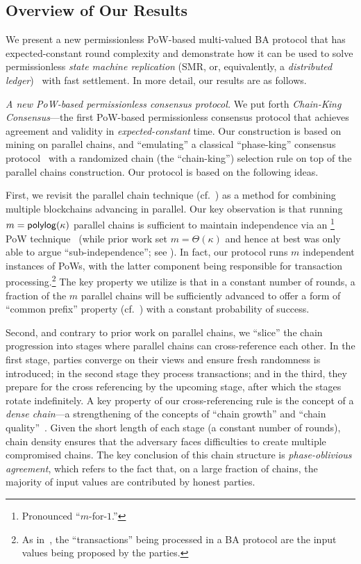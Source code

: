 \subsection{Overview of Our Results}
\label{subec:overview-of-our-results}

We present a new permissionless PoW-based multi-valued BA protocol that has expected-constant round complexity and demonstrate how it can be used to solve permissionless \emph{state machine replication} (SMR, or, equivalently, a \emph{distributed ledger})~\cite{CSUR:Schneider90} with fast settlement.
%
In more detail, our results are as follows.

\smallskip\noindent\emph{A new PoW-based permissionless consensus protocol.}
%
We put forth \emph{Chain-King Consensus}---the first PoW-based permissionless consensus protocol that achieves agreement and validity in \emph{expected-constant} time.
%
Our construction is based on mining on parallel chains, and ``emulating'' a classical ``phase-king'' consensus protocol~\cite{FOCS:BerGarPer89} with a randomized chain (the ``chain-king'') selection rule on top of the parallel chains construction.
%
Our protocol is based on the following ideas.

First, we revisit the parallel chain technique (cf.~\cite{EPRINT:FGKR18,CCS:BKTFV19,TCC:FGKR20}) as a method for combining multiple blockchains advancing in parallel.
%
Our key observation is that running $m = \mathsf{polylog}(\kappa)$ parallel chains is sufficient to maintain independence via an \mforone\footnote{Pronounced ``$m$-for-$1$.''} PoW technique~\cite{EC:GarKiaLeo15} (while prior work set $m = \Theta(\kappa)$ and hence at best was only able to argue ``sub-independence''; see \cite{TCC:FGKR20}).
%
In fact, our protocol runs $m$ independent instances of \twoforone PoWs, with the latter component being responsible for transaction processing.\footnote{As in~\cite{EC:GarKiaLeo15}, the ``transactions'' being processed in a BA protocol are the input values being proposed by the parties.}
%
The key property we utilize is that in a constant number of rounds, a fraction of the $m$ parallel chains will be sufficiently advanced to offer a form of ``common prefix'' property (cf.~\cite{EC:GarKiaLeo15}) with a constant probability of success.

Second, and contrary to prior work on parallel chains, we ``slice'' the chain progression into stages where parallel chains can cross-reference each other.
%
In the first stage, parties converge on their views and ensure fresh randomness is introduced; in the second stage they process transactions; and in the third, they prepare for the cross referencing by the upcoming stage, after which the stages rotate indefinitely.
%
A key property of our cross-referencing rule is the concept of a \emph{dense chain}---a strengthening of the concepts of ``chain growth'' and ``chain quality''~\cite{EC:GarKiaLeo15}.
%
Given the short length of each stage (a constant number of rounds), chain density ensures that the adversary faces difficulties to create multiple compromised chains.
%
The key conclusion of this chain structure is \emph{phase-oblivious agreement}, which refers to the fact that, on a large fraction of chains, the majority of input values are contributed by honest parties.

